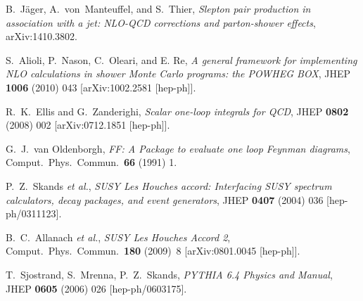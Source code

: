 \documentclass[a4paper,11pt]{article}
\begin{document}
\begin{thebibliography}{99}

 B.~J\"ager, A.~von~Manteuffel, and S.~Thier, {\em
  Slepton pair production in association with a jet:
  NLO-QCD corrections and parton-shower effects}, arXiv:1410.3802. 
  
 S.~Alioli, P.~Nason, C.~Oleari, and E. Re, {\em
    A general framework for implementing NLO calculations in shower
    Monte Carlo programs: the POWHEG BOX}, JHEP {\bf 1006} (2010)
  043  [arXiv:1002.2581 [hep-ph]].

  R.~K.~Ellis and G.~Zanderighi,
  {\em Scalar one-loop integrals for QCD}, 
  JHEP {\bf 0802} (2008) 002
  [arXiv:0712.1851 [hep-ph]].

  G.~J.~van Oldenborgh,
 {\em FF: A Package to evaluate one loop Feynman diagrams}, 
  Comput.\ Phys.\ Commun.\  {\bf 66} (1991) 1.

  P.~Z.~Skands  {\it et al.},
  {\em SUSY Les Houches accord: Interfacing SUSY spectrum calculators, decay packages, and event generators},  
  JHEP {\bf 0407} (2004) 036
  [hep-ph/0311123].

  B.~C.~Allanach  {\it et al.},
  {\em SUSY Les Houches Accord 2}, 
  Comput.\ Phys.\ Commun.\  {\bf 180} (2009)~8
  [arXiv:0801.0045 [hep-ph]].

  T.~Sjostrand, S.~Mrenna, P.~Z.~Skands,
  {\em PYTHIA 6.4 Physics and Manual},
  JHEP {\bf 0605 } (2006)  026
  [hep-ph/0603175]. 

\end{thebibliography}
\end{document}
